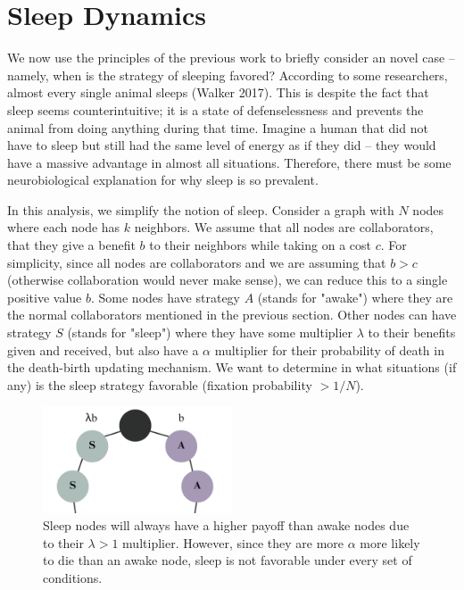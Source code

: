 \documentclass[11pt]{article}
\begin{document}
\section{Sleep Dynamics}
We now use the principles of the previous work to briefly consider an novel case -- namely, when is the strategy of sleeping favored? According to some researchers, almost every single animal sleeps (Walker 2017). This is despite the fact that sleep seems counterintuitive; it is a state of defenselessness and prevents the animal from doing anything during that time. Imagine a human that did not have to sleep but still had the same level of energy as if they did -- they would have a massive advantage in almost all situations. Therefore, there must be some neurobiological explanation for why sleep is so prevalent. 

In this analysis, we simplify the notion of sleep. Consider a graph with $N$ nodes where each node has $k$ neighbors. We assume that all nodes are collaborators, that they give a benefit $b$ to their neighbors while taking on a cost $c$. For simplicity, since all nodes are collaborators and we are assuming that $b > c$ (otherwise collaboration would never make sense), we can reduce this to a single positive value $b$. Some nodes have strategy $A$ (stands for "awake") where they are the normal collaborators mentioned in the previous section. Other nodes can have strategy $S$ (stands for "sleep") where they have some multiplier $\lambda$ to their benefits given and received, but also have a $\alpha$ multiplier for their probability of death in the death-birth updating mechanism. We want to determine in what situations (if any) is the sleep strategy favorable (fixation probability $>1/N$). 

\begin{figure}[htbp]
    \centering    \includegraphics[width=0.5\textwidth]{figures/sleep.png}
    \caption{Sleep nodes will always have a higher payoff than awake nodes due to their $\lambda > 1$ multiplier. However, since they are more $\alpha$ more likely to die than an awake node, sleep is not favorable under every set of conditions.}
    \label{fig:sleep}
\end{figure}
\end{document}

